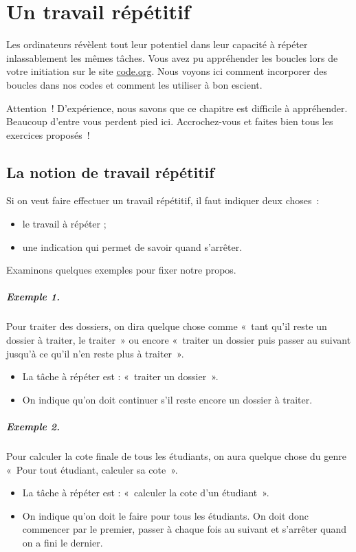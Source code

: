 \chapter{Un travail répétitif}
\label{chap:bcl}

	Les ordinateurs révèlent tout leur potentiel dans leur capacité à
	répéter inlassablement les mêmes tâches.
	Vous avez pu appréhender les boucles lors de votre initiation
	sur le site \url{code.org}.
	Nous voyons ici comment incorporer des boucles dans nos codes 
	et comment les utiliser à bon escient.

	Attention~! 
	D’expérience, nous savons que ce chapitre est difficile à appréhender. 
	Beaucoup d’entre vous perdent pied ici. 
	Accrochez-vous et faites bien tous les exercices proposés~!

\section{La notion de travail répétitif}

	Si on veut faire effectuer un travail répétitif, 
	il faut indiquer deux choses~:
	\begin{itemize}
	\item le travail à répéter ;
	\item une indication qui permet de savoir quand s'arrêter.
	\end{itemize}

	Examinons quelques exemples pour fixer notre propos.

	\paragraph{Exemple 1.} 
	Pour traiter des dossiers, 
	on dira quelque chose comme 
	«~tant qu’il reste un dossier à traiter, le traiter~» 
	ou encore 
	«~traiter un dossier puis passer au suivant jusqu’à ce qu’il n’en reste plus à traiter~».
	\begin{itemize}
	\item La tâche à répéter est : «~traiter un dossier~».
	\item On indique qu’on doit continuer s’il reste encore un dossier à traiter.
	\end{itemize}

	\paragraph{Exemple 2.}
	Pour calculer la cote finale de tous les étudiants,
	on aura quelque chose du genre 
	«~Pour tout étudiant, calculer sa cote~».
	\begin{itemize}
	\item 
		La tâche à répéter est : «~calculer la cote d’un étudiant~».
	\item 
		On indique qu’on doit le faire pour tous les étudiants.
		On doit donc commencer par le premier, passer à chaque fois au suivant
		et s’arrêter quand on a fini le dernier.
	\end{itemize}

